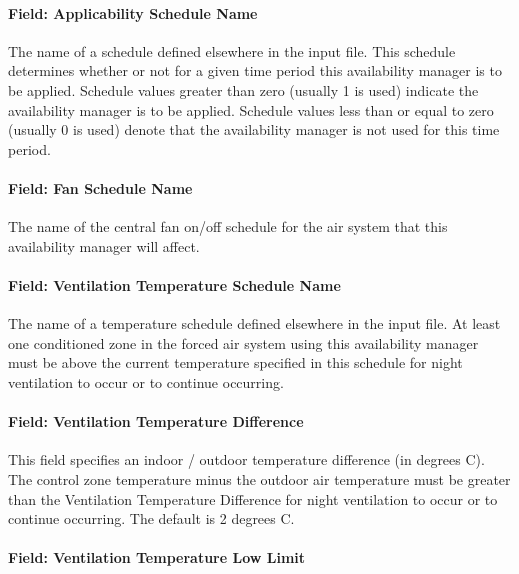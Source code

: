 \paragraph{Field: Applicability Schedule Name}\label{field-applicability-schedule-name-1}

The name of a schedule defined elsewhere in the input file. This schedule determines whether or not for a given time period this availability manager is to be applied. Schedule values greater than zero (usually 1 is used) indicate the availability manager is to be applied. Schedule values less than or equal to zero (usually 0 is used) denote that the availability manager is not used for this time period.

\paragraph{Field: Fan Schedule Name}\label{field-fan-schedule-name}

The name of the central fan on/off schedule for the air system that this availability manager will affect.

\paragraph{Field: Ventilation Temperature Schedule Name}\label{field-ventilation-temperature-schedule-name}

The name of a temperature schedule defined elsewhere in the input file. At least one conditioned zone in the forced air system using this availability manager must be above the current temperature specified in this schedule for night ventilation to occur or to continue occurring.

\paragraph{Field: Ventilation Temperature Difference}\label{field-ventilation-temperature-difference}

This field specifies an indoor / outdoor temperature difference (in degrees C). The control zone temperature minus the outdoor air temperature must be greater than the Ventilation Temperature Difference for night ventilation to occur or to continue occurring. The default is 2 degrees C.

\paragraph{Field: Ventilation Temperature Low Limit}\label{field-ventilation-temperature-low-limit}

